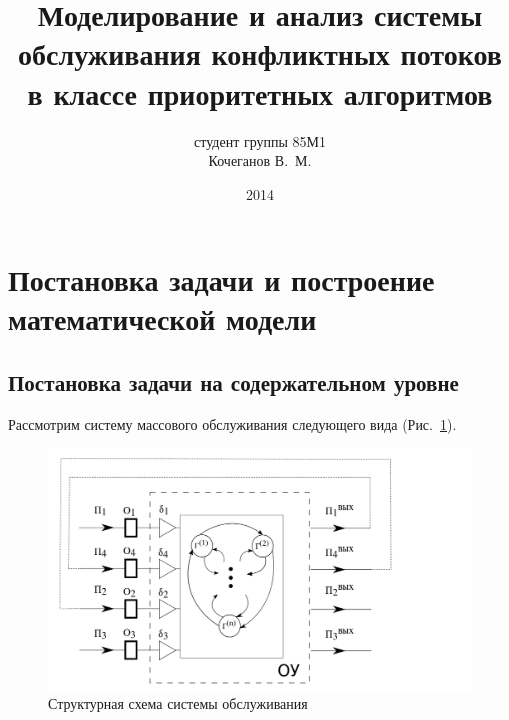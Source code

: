 \documentclass[a4paper,12pt,russian]{extarticle}
\title{Моделирование и анализ системы обслуживания конфликтных потоков в классе приоритетных алгоритмов}
\author{студент группы 85М1\\ Кочеганов В.~М.}
\date{2014}
\begin{document}
\section{Постановка задачи и построение математической модели}

\subsection{Постановка задачи на содержательном уровне}

Рассмотрим систему массового обслуживания следующего вида (Рис.~\ref{SystemScheme}).
\begin{figure}[h]
\includegraphics[scale=0.5]{SystemScheme.png} 
\caption{Структурная схема системы обслуживания}
\label{SystemScheme}
\end{figure}
\end{document}
